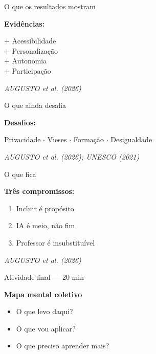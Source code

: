 \documentclass[11pt]{beamer}
\newcommand{\citabnt}[1]{%
	\vfill
	\begin{flushright}
		\tiny\textit{#1}
	\end{flushright}
}
\begin{document}
	\begin{frame}{O que os resultados mostram}
		\begin{center}
			\Large \textbf{Evidências:}
		\end{center}
		\vspace{1em}
		\begin{center}
			\Large
			$+$ Acessibilidade\\
			$+$ Personalização\\
			$+$ Autonomia\\
			$+$ Participação
		\end{center}
		\citabnt{AUGUSTO et al. (2026)}
	\end{frame}
	
	\begin{frame}{O que ainda desafia}
		\begin{center}
			\Large \textbf{Desafios:}
		\end{center}
		\vspace{1em}
		\begin{center}
			\Large
			Privacidade $\cdot$ Vieses $\cdot$ Formação $\cdot$ Desigualdade
		\end{center}
		\citabnt{AUGUSTO et al. (2026); UNESCO (2021)}
	\end{frame}
	
	\begin{frame}{O que fica}
		\begin{center}
			\Large \textbf{Três compromissos:}
		\end{center}
		\vspace{1.5em}
		\begin{enumerate}
			\item Incluir é propósito
			\item IA é meio, não fim
			\item Professor é insubstituível
		\end{enumerate}
		\citabnt{AUGUSTO et al. (2026)}
	\end{frame}
	
	\begin{frame}{Atividade final — 20 min}
		\begin{center}
			\Large \textbf{Mapa mental coletivo}
		\end{center}
		\vspace{1.5em}
		\begin{itemize}
			\item O que levo daqui?
			\item O que vou aplicar?
			\item O que preciso aprender mais?
		\end{itemize}
	\end{frame}
	
\end{document}
